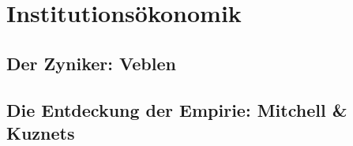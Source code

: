 %
%
%

\chapter{Institutionsökonomik}
\label{Institut}


\section{Der Zyniker: Veblen}

\section{Die Entdeckung der Empirie: Mitchell \& Kuznets}






